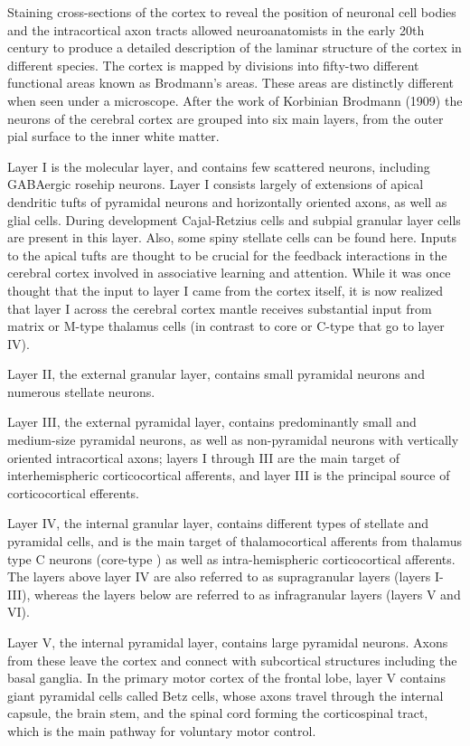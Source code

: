 Staining cross-sections of the cortex to reveal the position of neuronal cell bodies and the intracortical axon tracts allowed neuroanatomists in the early 20th century to produce a detailed description of the laminar structure of the cortex in different species. The cortex is mapped by divisions into fifty-two different functional areas known as Brodmann's areas. These areas are distinctly different when seen under a microscope. After the work of Korbinian Brodmann (1909) the neurons of the cerebral cortex are grouped into six main layers, from the outer pial surface to the inner white matter.

Layer I is the molecular layer, and contains few scattered neurons, including GABAergic rosehip neurons. Layer I consists largely of extensions of apical dendritic tufts of pyramidal neurons and horizontally oriented axons, as well as glial cells. During development Cajal-Retzius cells and subpial granular layer cells are present in this layer. Also, some spiny stellate cells can be found here. Inputs to the apical tufts are thought to be crucial for the feedback interactions in the cerebral cortex involved in associative learning and attention. While it was once thought that the input to layer I came from the cortex itself, it is now realized that layer I across the cerebral cortex mantle receives substantial input from matrix or M-type thalamus cells (in contrast to core or C-type that go to layer IV).

Layer II, the external granular layer, contains small pyramidal neurons and numerous stellate neurons.

Layer III, the external pyramidal layer, contains predominantly small and medium-size pyramidal neurons, as well as non-pyramidal neurons with vertically oriented intracortical axons; layers I through III are the main target of interhemispheric corticocortical afferents, and layer III is the principal source of corticocortical efferents.

Layer IV, the internal granular layer, contains different types of stellate and pyramidal cells, and is the main target of thalamocortical afferents from thalamus type C neurons (core-type ) as well as intra-hemispheric corticocortical afferents. The layers above layer IV are also referred to as supragranular layers (layers I-III), whereas the layers below are referred to as infragranular layers (layers V and VI).

Layer V, the internal pyramidal layer, contains large pyramidal neurons. Axons from these leave the cortex and connect with subcortical structures including the basal ganglia. In the primary motor cortex of the frontal lobe, layer V contains giant pyramidal cells called Betz cells, whose axons travel through the internal capsule, the brain stem, and the spinal cord forming the corticospinal tract, which is the main pathway for voluntary motor control.

